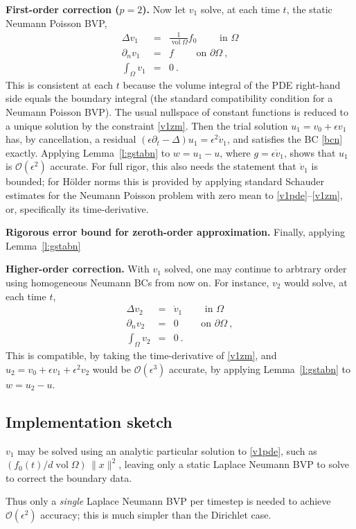 \documentclass[10pt]{article}
\newcommand{\bea}{\begin{eqnarray}}
\newcommand{\eea}{\end{eqnarray}}
\newcommand{\bigO}{{\mathcal O}}
\DeclareMathOperator{\vol}{vol}
\newcommand{\pO}{{\partial\Omega}}
\newcommand{\eps}{\epsilon}
\newcommand{\dn}{\partial_n}
\newcommand{\dt}{\partial_t}
\begin{document}
{\bf First-order correction ($p=2$).}
Now let $v_1$ solve, at each time $t$, the static Neumann Poisson BVP,
\bea
\Delta v_1 &=& \frac{1}{\vol\Omega} f_0 \qquad \mbox{ in } \Omega
\label{v1pde}
\\
\dn v_1 &=& f \qquad \mbox{ on } \pO~,
\\
\int_\Omega v_1 &=& 0~.
\label{v1zm}
\eea
This is consistent at each $t$ because the volume integral of the PDE
right-hand side equals the boundary integral
(the standard compatibility condition for a Neumann Poisson BVP).
The usual nullspace of constant functions is reduced to a unique solution
by the constraint \eqref{v1zm}.
Then the trial solution
$u_1 = v_0 + \eps v_1$
has, by cancellation, a residual $(\eps \dt -\Delta)u_1 = \eps^2 \dot v_1$,
and satisfies the BC \eqref{bcn} exactly.
Applying Lemma~\ref{l:gstabn} to $w=u_1 -u$, where $g=\eps \dot v_1$,
shows that $u_1$ is $\bigO(\eps^2)$ accurate.
For full rigor, this also needs the statement that $\dot v_1$ is
bounded; for H\"older norms this is provided by applying
standard Schauder estimates \cite{nardi15} for the Neumann Poisson problem
with zero mean to \eqref{v1pde}--\eqref{v1zm}, or, specifically
its time-derivative.

{\bf Rigorous error bound for zeroth-order approximation.}
Finally, applying Lemma~\ref{l:gstabn}




{\bf Higher-order correction.}
With $v_1$ solved,
one may continue to arbtrary order using homogeneous Neumann BCs
from now on.
For instance, $v_2$ would solve, at each time $t$,
\bea
\Delta v_2 &=& \dot v_1 \qquad \mbox{ in } \Omega
\\
\dn v_2 &=& 0 \qquad \mbox{ on } \pO~,
\\
\int_\Omega v_2 &=& 0~.
\eea
This is compatible, by taking the time-derivative of \eqref{v1zm},
and $u_2=v_0+\eps v_1 + \eps^2 v_2$ would be $\bigO(\eps^3)$
accurate, by applying Lemma~\ref{l:gstabn} to $w = u_2-u$.



\subsection{Implementation sketch}

$v_1$ may be solved using an analytic particular solution to \eqref{v1pde},
such as $(f_0(t)/d \vol\Omega)\,\|x\|^2$, leaving
only a static Laplace Neumann BVP to solve to correct the boundary data.

Thus only a {\em single} Laplace Neumann BVP per timestep is needed
to achieve $\bigO(\eps^2)$ accuracy; this is much simpler than
the Dirichlet case.
\end{document}
